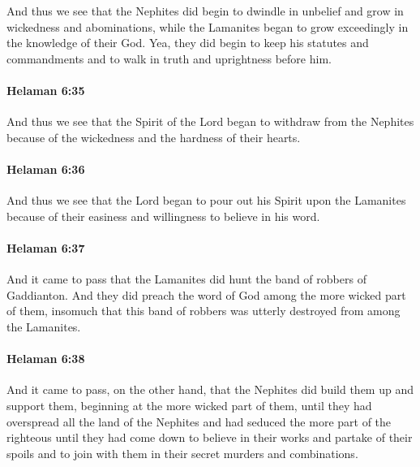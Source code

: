 			And thus we see that the Nephites did begin to dwindle in unbelief
			and grow in wickedness and abominations,
			while the Lamanites began to grow exceedingly in the knowledge of their God.
			Yea, they did begin to keep his statutes and commandments
			and to walk in truth and uprightness before him.

		\paragraph{Helaman 6:35} %
			\label{HELAMAN-6-35}

			And thus we see that the Spirit of the Lord began to withdraw from the Nephites
			because of the wickedness and the hardness of their hearts.

		\paragraph{Helaman 6:36} %
			\label{HELAMAN-6-36}

			And thus we see that the Lord began to pour out his Spirit upon the Lamanites
			because of their easiness and willingness to believe in his word.

		\paragraph{Helaman 6:37} %
			\label{HELAMAN-6-37}

			And it came to pass that the Lamanites did hunt the band of robbers of Gaddianton.
			And they did preach the word of God among the more wicked part of them,
			insomuch that this band of robbers was utterly destroyed
			from among the Lamanites.

		\paragraph{Helaman 6:38} %
			\label{HELAMAN-6-38}

			And it came to pass, on the other hand,
			that the Nephites did build them up and support them,
			beginning at the more wicked part of them,
			until they had overspread all the land of the Nephites
			and had seduced the more part of the righteous
			until they had come down to believe in their works
			and partake of their spoils
			and to join with them in their secret murders and combinations.

